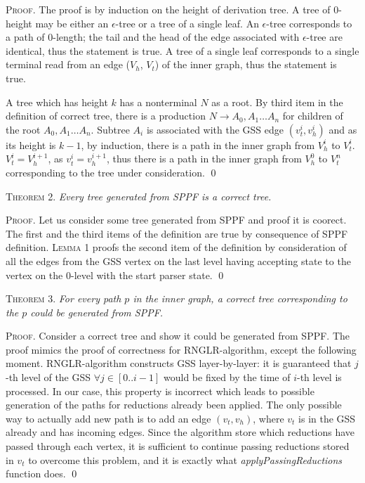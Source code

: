 \textsc{Proof.}
The proof is by induction on the height of derivation tree. 
A tree of 0-height may be either an $\epsilon$-tree or a tree of a single leaf.
An $\epsilon$-tree corresponds to a path of 0-length; the tail and the head of the edge associated with 
$\epsilon$-tree are identical, thus the statement is true. A tree of a single leaf corresponds to a single 
terminal read from an edge ($V_{h}$, $V_{t}$) of the inner graph, thus the statement is true.

A tree which has height $k$ has a nonterminal $N$ as a root. By third item in the definition of correct tree, 
there is a production $N \rightarrow A_{0}, A_{1} \dots A_{n}$ for children of the root $A_{0}, A_{1} \dots A_{n}$. 
Subtree $A_{i}$ is associated with the GSS edge $(v_{t}^{i}, v_{h}^{i})$ and as its height is $k-1$, by induction,
there is a path in the inner graph from $V_{h}^{i}$ to $V_{t}^{i}$. $V_{t}^i = V_{h}^{i+1}$, as $v_{t}^i = v_{h}^{i+1}$, 
thus there is a path in the inner graph from $V_{h}^{0}$ to $V_{t}^{n}$ corresponding to the tree under consideration.
\qed

\textsc{Theorem 2.} 
\textit{Every tree generated from SPPF is a correct tree.}

\textsc{Proof.} Let us consider some tree generated from SPPF and proof it is coorect. 
The first and the third items of the definition are true by consequence of SPPF definition.
\textsc{Lemma 1} proofs the second item of the definition by consideration of all the edges from the GSS vertex
on the last level having accepting state to the vertex on the 0-level with the start parser state.
\qed

\textsc{Theorem 3.} 
\textit{For every path $p$ in the inner graph, a correct tree corresponding to the $p$ could be generated from SPPF.}

\textsc{Proof.}
Consider a correct tree and show it could be generated from SPPF. The proof mimics the proof of correctness for RNGLR-algorithm,
except the following moment. RNGLR-algorithm constructs GSS layer-by-layer: it is guaranteed that $j$-th level of the GSS 
$\forall j \in [0..i-1]$ would be fixed by the time of $i$-th level is processed. In our case, this property is incorrect 
which leads to possible generation of the paths for reductions already been applied. The only possible way to actually 
add new path is to add an edge $(v_{t}, v_{h})$, where $v_{t}$ is in the GSS already and has incoming edges.
Since the algorithm store which reductions have passed through each vertex, it is sufficient to continue passing 
reductions stored in $v_{t}$ to overcome this problem, and it is exactly what \emph{applyPassingReductions} function does. 
\qed